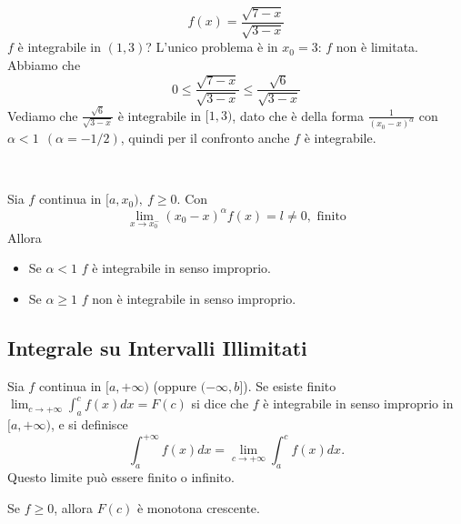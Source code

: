 \begin{esempio}
    \begin{equation}
        f(x) = \frac{\sqrt{7-x}}{\sqrt{3-x}}
    \end{equation}
    $f$ è integrabile in $(1,3)$? L'unico problema è in $x_0=3$: $f$ non è limitata. Abbiamo che
    \begin{equation}
        0 \leq \frac{\sqrt{7-x}}{\sqrt{3-x}} \leq \frac{\sqrt{6}}{\sqrt{3-x}}
    \end{equation}
    Vediamo che $\frac{\sqrt{6}}{\sqrt{3-x}}$ è integrabile in $[1,3)$, dato che è della forma $\frac{1}{(x_0-x)^\alpha}$ con $\alpha < 1\ \ (\alpha = -1/2)$, quindi per il confronto anche $f$ è integrabile.
\end{esempio}
\leavevmode \\

\begin{proprieta}
    Sia $f$ continua in $[a,x_0),\ f\geq 0$. Con
    \begin{equation}
        \lim_{x\to x_0^-}(x_0-x)^\alpha f(x) = l \not= 0, \text{ finito}
    \end{equation}
    Allora
    \begin{itemize}
        \item Se $\alpha < 1$ $f$ è integrabile in senso improprio.
        \item Se $\alpha \geq 1$ $f$ non è integrabile in senso improprio.
    \end{itemize}
\end{proprieta}

\subsection{Integrale su Intervalli Illimitati}
\begin{definizione}
    Sia $f$ continua in $[a, +\infty)$ (oppure $(-\infty, b]$). Se esiste finito $\lim_{c\to +\infty}\int_{a}^{c} f(x) dx = F(c)$ si dice che $f$ è integrabile in senso improprio in $[a, +\infty)$, e si definisce
    \begin{equation}
        \int_{a}^{+\infty} f(x) dx = \lim_{c\to +\infty}\int_{a}^{c} f(x) dx.
    \end{equation}
    Questo limite può essere finito o infinito.
\end{definizione}

\begin{osservazione}
    Se $f \geq 0$, allora $F(c)$ è monotona crescente.
\end{osservazione}

